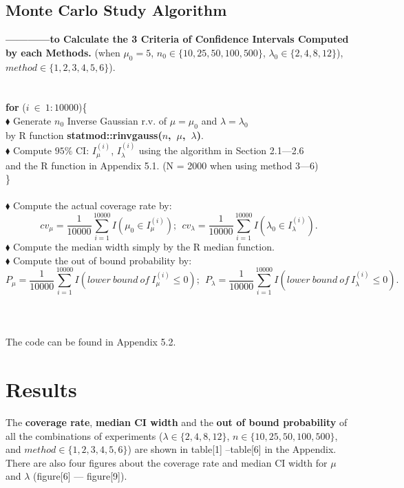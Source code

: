\documentclass[12pt]{article}
\begin{document}
\subsection{Monte Carlo Study Algorithm }
\textbf{------------to Calculate the 3 Criteria of Confidence Intervals Computed by each Methods.} (when $\mu_0 =5$, $n_0 \in \{10,25,50,100,500\}$, $\lambda_0 \in \{2,4,8,12\}$),$method \in \{1,2,3,4,5,6\}$).\\
 \\
 \\
 \textbf{for} ($i \ \in \ 1:10000$)\{\\
  $\blacklozenge$ Generate $n_0$ Inverse Gaussian r.v. of $\mu=\mu_0$ and $\lambda=\lambda_0$ \\
  by R function \textbf{statmod::rinvgauss($n$,\ $\mu$,\ $\lambda$)}.\\
$\blacklozenge$ Compute $95\%$ CI: $I_{\mu}^{(i)}$, $I_{\lambda}^{(i)}$  using the algorithm in Section 2.1---2.6\\
 and the R function in Appendix 5.1. (N = 2000 when using method 3---6)\\
\}\\
\\
$\blacklozenge$ Compute the actual coverage rate by:
 $$cv_{\mu}=\frac{1}{10000}\sum_{i=1}^{10000}I(\mu_0 \in I_{\mu}^{(i)}); \ \ cv_{\lambda}=\frac{1}{10000}\sum_{i=1}^{10000}I(\lambda_0 \in I_{\lambda}^{(i)}).$$
$\blacklozenge$ Compute the median width simply by the R median function.\\
$\blacklozenge$ Compute the out of bound probability by:
 $$P_{\mu}=\frac{1}{10000}\sum_{i=1}^{10000}I(lower\ bound\ of\ I_{\mu}^{(i)} \leq 0); \ \ P_{\lambda}=\frac{1}{10000}\sum_{i=1}^{10000}I(lower\ bound\ of\ I_{\lambda}^{(i)} \leq 0).$$
\\
\\
\\
The code can be found in Appendix 5.2.\\


\section{Results}

The \textbf{coverage rate}, \textbf{median CI width} and the \textbf{out of bound probability} of all the combinations of experiments ($\lambda \in \{2,4,8,12\}$, $n \in \{10,25,50,100,500\}$, and $method \in \{1,2,3,4,5,6\}$) are shown in table[1] --table[6] in the Appendix. There are also four figures about the coverage rate and median CI width for $\mu$ and $\lambda$ (figure[6] --- figure[9]).
\end{document}
